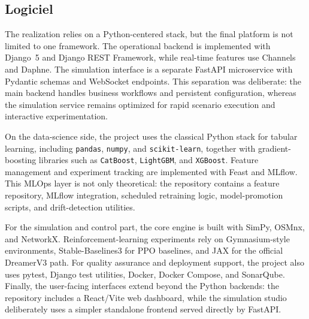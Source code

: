 \subsection{Logiciel}
\label{sec:software-environment}

The realization relies on a Python-centered stack, but the final platform is not limited to one framework. The operational backend is implemented with Django~5 and Django REST Framework, while real-time features use Channels and Daphne. The simulation interface is a separate FastAPI microservice with Pydantic schemas and WebSocket endpoints. This separation was deliberate: the main backend handles business workflows and persistent configuration, whereas the simulation service remains optimized for rapid scenario execution and interactive experimentation.

On the data-science side, the project uses the classical Python stack for tabular learning, including \texttt{pandas}, \texttt{numpy}, and \texttt{scikit-learn}, together with gradient-boosting libraries such as \texttt{CatBoost}, \texttt{LightGBM}, and \texttt{XGBoost}. Feature management and experiment tracking are implemented with Feast and MLflow. This MLOps layer is not only theoretical: the repository contains a feature repository, MLflow integration, scheduled retraining logic, model-promotion scripts, and drift-detection utilities.

For the simulation and control part, the core engine is built with SimPy, OSMnx, and NetworkX. Reinforcement-learning experiments rely on Gymnasium-style environments, Stable-Baselines3 for PPO baselines, and JAX for the official DreamerV3 path. For quality assurance and deployment support, the project also uses pytest, Django test utilities, Docker, Docker Compose, and SonarQube. Finally, the user-facing interfaces extend beyond the Python backends: the repository includes a React/Vite web dashboard, while the simulation studio deliberately uses a simpler standalone frontend served directly by FastAPI.

